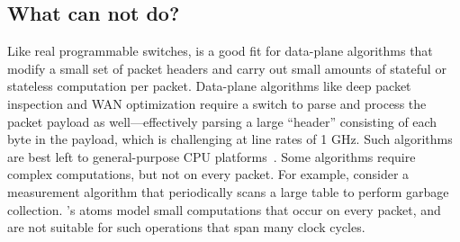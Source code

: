 \subsection{What can \absmachine not do?}
\label{ss:limitations}

Like real programmable switches, \absmachine is a good fit for data-plane
algorithms that modify a small set of packet headers and carry out small
amounts of stateful or stateless computation per packet. Data-plane algorithms
like deep packet inspection and WAN optimization require a switch to parse and
process the packet payload as well---effectively parsing a large ``header''
consisting of each byte in the payload, which is challenging at line rates of 1
GHz. Such algorithms are best left to general-purpose CPU platforms~\cite{e2,
aplomb, opennf}. Some algorithms require complex computations, but not on every
packet.  For example, consider a measurement algorithm that periodically scans
a large table to perform garbage collection.  \absmachine's atoms model small
computations that occur on every packet, and are not suitable for such
operations that span many clock cycles.
